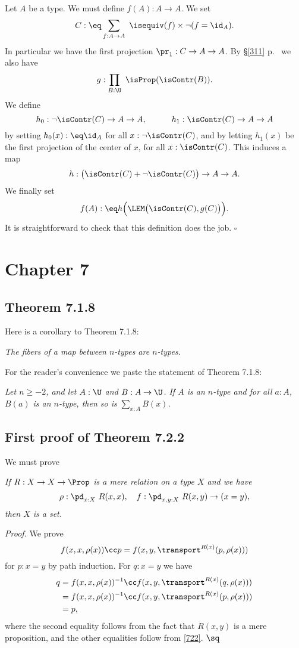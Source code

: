 \documentclass[12pt]{article}
\begin{document}
Let $A$ be a type. We must define $f(A):A\to A$. We set 
$$
C:\eq\sum_{f:A\to A}\ \isequiv(f)\times\neg(f=\id_A).
$$ 
In particular we have the first projection $\pr_1:C\to A\to A$. By \S\ref{311} p.~\pageref{311} we also have 
$$
g:\prod_{B:\U}\ \isProp(\isContr(B)).
$$ 
We define 
$$
h_0:\neg\isContr(C)\to A\to A,\qquad\quad h_1:\isContr(C)\to A\to A
$$ 
by setting $h_0(x):\eq\id_A$ for all $x:\neg\isContr(C)$, and by letting $h_1(x)$ be the first projection of the center of $x$, for all $x:\isContr(C)$. This induces a map 
$$
h:\big(\isContr(C)+\neg\isContr(C)\big)\to A\to A.
$$ 
We finally set 
$$
f(A):\eq h\Big(\LEM\big(\isContr(C),g(C)\big)\Big).
$$
It is straightforward to check that this definition does the job. $\square$


\section{Chapter 7}

\subsection{Theorem 7.1.8}\label{718}

Here is a corollary to Theorem 7.1.8: 

\emph{The fibers of a map between $n$-types are $n$-types.}

For the reader's convenience we paste the statement of Theorem 7.1.8:

\nn{} \emph{Let $n\geq-2$, and let $A:\U$ and $B:A\to\U$. If $A$ is an $n$-type and for all $a:A$, $B(a)$ is an $n$-type, then so is $\sum_{x:A}B(x)$.}


\subsection{First proof of Theorem 7.2.2}

We must prove  

\nn{} \emph{If $R:X\to X\to\Prop$ is a mere relation on a type $X$ and we have 
$$
\rho:\pd_{x:X}\ R(x,x),\quad f:\pd_{x,y:X}\ R(x,y)\to(x=y),
$$ 
then $X$ is a set.}

\nn\emph{Proof.} We prove 
\begin{equation}\label{722}
f(x,x,\rho(x))\cc p=f(x,y,\transport^{R(x)}(p,\rho(x)))
\end{equation}  
for $p:x=y$ by path induction. For $q:x=y$ we have 
\begin{align*}
q&=f(x,x,\rho(x))^{-1}\cc f(x,y,\transport^{R(x)}(q,\rho(x)))\\
&=f(x,x,\rho(x))^{-1}\cc f(x,y,\transport^{R(x)}(p,\rho(x)))\\
&=p,
\end{align*} 
where the second equality follows from the fact that $R(x,y)$ is a mere proposition, and the other equalities follow from \eqref{722}. $\sq$
\end{document}
